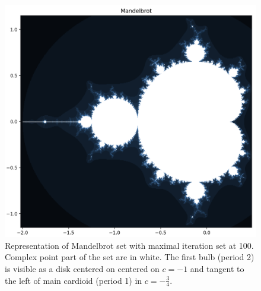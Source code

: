 \documentclass{article}
\begin{document}
    \begin{figure}[h]
        \centering
        \includegraphics[width=.8\textwidth]{pictures/part_1/mandelbrot_set_1.png}
        \caption{Representation of Mandelbrot set with maximal iteration set at 100. Complex point part of the set are in white. The first bulb (period 2) is visible as a disk centered on centered on $c = -1$ and tangent to the left of main cardioid (period 1) in $c=-\frac{3}{4}$.}
        \label{fig:mandelbrot_set}
    \end{figure}
\end{document}

